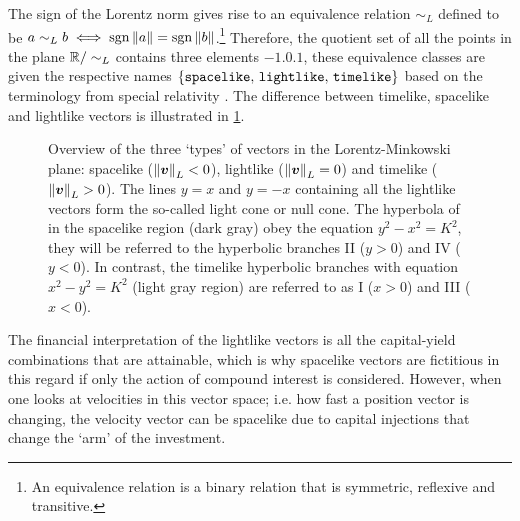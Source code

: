 The sign of the Lorentz norm gives rise to an equivalence relation \(\sim_L\) defined to be \(a \sim_L b \iff \operatorname{sgn}{\norm{a}} = \operatorname{sgn}{\norm{b}}\).\footnote{An equivalence relation is a binary relation that is symmetric, reflexive and transitive.} Therefore, the quotient set of all the points in the plane \(\mathbb{R} / \sim_L \) contains three elements \(\qty{-1, 0, 1}\), these equivalence classes are given the respective names \(\qty{\text{\texttt{spacelike}},\, \text{\texttt{lightlike}},\, \text{\texttt{timelike}}}\) based on the terminology from special relativity \cite{Landau1971}. The difference between timelike, spacelike and lightlike vectors is illustrated in \cref{fig:lightlike_spacelike}.

\begin{figure}[ht]
    \centering
    
    \caption{Overview of the three `types' of vectors in the Lorentz-Minkowski plane: spacelike (\(\norm{\vb*{v}}_L < 0\)), lightlike (\(\norm{\vb*{v}}_L = 0\)) and timelike (\(\norm{\vb*{v}}_L > 0\)). The lines \(y = x\) and \(y = -x\) containing all the lightlike vectors form the so-called light cone or null cone. The hyperbola of in the spacelike region (dark gray) obey the equation \(y^2 - x^2 = K^2\), they will be referred to the hyperbolic branches II (\(y > 0\)) and IV (\(y < 0\)). In contrast, the timelike hyperbolic branches with equation \(x^2 - y^2 = K^2\) (light gray region) are referred to as I (\(x > 0\)) and III (\(x < 0\)).}
    \label{fig:lightlike_spacelike}
\end{figure}
The financial interpretation of the lightlike vectors is all the capital-yield combinations that are attainable, which is why spacelike vectors are fictitious in this regard if only the action of compound interest is considered. However, when one looks at velocities in this vector space; i.e. how fast a position vector is changing, the velocity vector can be spacelike due to capital injections that change the `arm' of the investment. 

